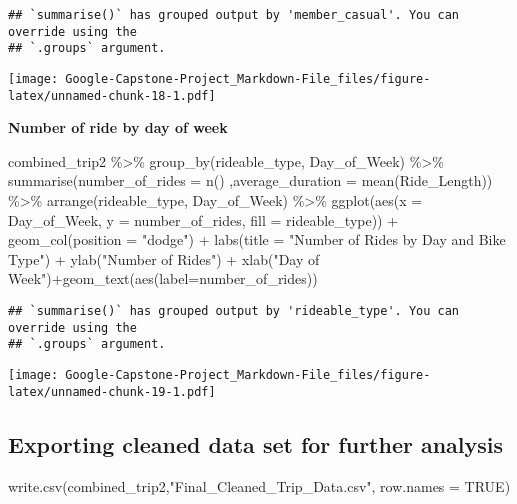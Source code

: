 \documentclass[
]{article}
\newenvironment{Shaded}{\begin{snugshade}}{\end{snugshade}}
\newcommand{\AttributeTok}[1]{\textcolor[rgb]{0.77,0.63,0.00}{#1}}
\newcommand{\ConstantTok}[1]{\textcolor[rgb]{0.00,0.00,0.00}{#1}}
\newcommand{\FunctionTok}[1]{\textcolor[rgb]{0.00,0.00,0.00}{#1}}
\newcommand{\NormalTok}[1]{#1}
\newcommand{\SpecialCharTok}[1]{\textcolor[rgb]{0.00,0.00,0.00}{#1}}
\newcommand{\StringTok}[1]{\textcolor[rgb]{0.31,0.60,0.02}{#1}}
\begin{document}
\begin{verbatim}
## `summarise()` has grouped output by 'member_casual'. You can override using the
## `.groups` argument.
\end{verbatim}

\texttt{[image: Google-Capstone-Project\_Markdown-File\_files/figure-latex/unnamed-chunk-18-1.pdf]}

\textbf{Number of ride by day of week}

\begin{Shaded}
\begin{Highlighting}[]
\NormalTok{combined\_trip2 }\SpecialCharTok{\%\textgreater{}\%} 
  \FunctionTok{group\_by}\NormalTok{(rideable\_type, Day\_of\_Week) }\SpecialCharTok{\%\textgreater{}\%} 
  \FunctionTok{summarise}\NormalTok{(}\AttributeTok{number\_of\_rides =} \FunctionTok{n}\NormalTok{()}
\NormalTok{            ,}\AttributeTok{average\_duration =} \FunctionTok{mean}\NormalTok{(Ride\_Length)) }\SpecialCharTok{\%\textgreater{}\%} 
  \FunctionTok{arrange}\NormalTok{(rideable\_type, Day\_of\_Week)  }\SpecialCharTok{\%\textgreater{}\%} 
  \FunctionTok{ggplot}\NormalTok{(}\FunctionTok{aes}\NormalTok{(}\AttributeTok{x =}\NormalTok{ Day\_of\_Week, }\AttributeTok{y =}\NormalTok{ number\_of\_rides, }\AttributeTok{fill =}\NormalTok{ rideable\_type)) }\SpecialCharTok{+}
  \FunctionTok{geom\_col}\NormalTok{(}\AttributeTok{position =} \StringTok{"dodge"}\NormalTok{) }\SpecialCharTok{+} 
  \FunctionTok{labs}\NormalTok{(}\AttributeTok{title =} \StringTok{"Number of Rides by Day and Bike Type"}\NormalTok{) }\SpecialCharTok{+} 
  \FunctionTok{ylab}\NormalTok{(}\StringTok{"Number of Rides"}\NormalTok{) }\SpecialCharTok{+} 
  \FunctionTok{xlab}\NormalTok{(}\StringTok{"Day of Week"}\NormalTok{)}\SpecialCharTok{+}\FunctionTok{geom\_text}\NormalTok{(}\FunctionTok{aes}\NormalTok{(}\AttributeTok{label=}\NormalTok{number\_of\_rides))}
\end{Highlighting}
\end{Shaded}

\begin{verbatim}
## `summarise()` has grouped output by 'rideable_type'. You can override using the
## `.groups` argument.
\end{verbatim}

\texttt{[image: Google-Capstone-Project\_Markdown-File\_files/figure-latex/unnamed-chunk-19-1.pdf]}

\hypertarget{exporting-cleaned-data-set-for-further-analysis}{%
\subsection{Exporting cleaned data set for further
analysis}\label{exporting-cleaned-data-set-for-further-analysis}}

\begin{Shaded}
\begin{Highlighting}[]
\FunctionTok{write.csv}\NormalTok{(combined\_trip2,}\StringTok{"Final\_Cleaned\_Trip\_Data.csv"}\NormalTok{, }\AttributeTok{row.names =} \ConstantTok{TRUE}\NormalTok{)}
\end{Highlighting}
\end{Shaded}
\end{document}
